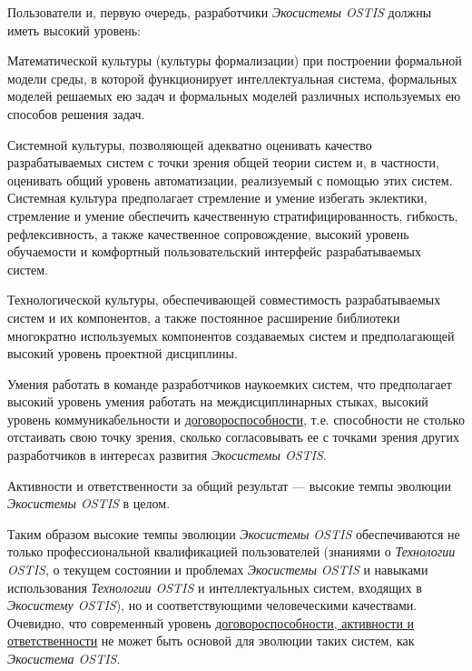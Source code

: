 \begin{SCn}
\begin{scnsubstruct}
{        Пользователи и, первую очередь, разработчики \textit{Экосистемы OSTIS} должны иметь высокий уровень:
        \begin{scnitemize}
            \item Математической культуры (культуры формализации) при построении формальной модели среды, в которой функционирует интеллектуальная система, формальных моделей решаемых ею задач и формальных моделей различных используемых ею способов решения задач.
            \item Системной культуры, позволяющей адекватно оценивать качество разрабатываемых систем с точки зрения общей теории систем и, в частности, оценивать общий уровень автоматизации, реализуемый с помощью этих систем. Системная культура предполагает стремление и умение избегать эклектики, стремление и умение обеспечить качественную стратифицированность, гибкость, рефлексивность, а также качественное сопровождение, высокий уровень обучаемости и комфортный пользовательский интерфейс разрабатываемых систем.
            \item Технологической культуры, обеспечивающей совместимость разрабатываемых систем и их компонентов, а также постоянное расширение библиотеки многократно используемых компонентов создаваемых систем и предполагающей высокий уровень проектной дисциплины.
            \item Умения работать в команде разработчиков наукоемких систем, что предполагает высокий уровень умения работать на междисциплинарных стыках, высокий уровень коммуникабельности и \uline{договороспособности}, т.е. способности не столько отстаивать свою точку зрения, сколько согласовывать ее с точками зрения других разработчиков в интересах развития \textit{Экосистемы OSTIS}.
            \item Активности и ответственности за общий результат --- высокие темпы эволюции \textit{Экосистемы OSTIS} в целом.
        \end{scnitemize}
        Таким образом высокие темпы эволюции \textit{Экосистемы OSTIS} обеспечиваются не только профессиональной квалификацией пользователей (знаниями о \textit{Технологии OSTIS}, о текущем состоянии и проблемах \textit{Экосистемы OSTIS} и навыками использования \textit{Технологии OSTIS} и интеллектуальных систем, входящих в \textit{Экосистему OSTIS}), но и соответствующими человеческими качествами. Очевидно, что современный уровень \uline{договороспособности, активности и ответственности} не может быть основой для эволюции таких систем, как \textit{Экосистема OSTIS}.\\
}
\end{scnsubstruct}
\end{SCn}
